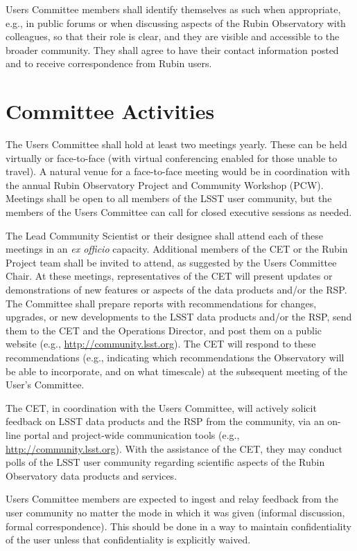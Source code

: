 \documentclass[OPS,toc]{lsstdoc}
\begin{document}
Users Committee members shall identify themselves as such when appropriate, e.g., in public forums or when discussing aspects of the Rubin Observatory with colleagues, so that their role is clear, and they are visible and accessible to the broader community.
They shall agree to have their contact information posted and to receive correspondence from Rubin users.

\section{Committee Activities}

The Users Committee shall hold at least two meetings yearly.
These can be held virtually or face-to-face (with virtual conferencing enabled for those unable to travel).
A natural venue for a face-to-face meeting would be in coordination with the annual Rubin Observatory Project and Community Workshop (PCW).
Meetings shall be open to all members of the LSST user community, but the members of the Users Committee can call for closed executive sessions as needed.  

The Lead Community Scientist or their designee shall attend each of these meetings in an \textit{ex officio} capacity.
Additional members of the CET or the Rubin Project team shall be invited to attend, as suggested by the Users Committee Chair.
At these meetings, representatives of the CET will present updates or demonstrations of new features or aspects of the data products and/or the RSP.
The Committee shall prepare reports with recommendations for changes, upgrades, or new developments to the LSST data products and/or the RSP, send them to the CET and the Operations Director, and post them on a public website (e.g., \url{http://community.lsst.org}).
The CET will respond to these recommendations (e.g., indicating which recommendations the Observatory will be able to incorporate, and on what timescale) at the subsequent meeting of the User’s Committee.  

The CET, in coordination with the Users Committee, will actively solicit feedback on LSST data products and the RSP from the community, via an on-line portal and project-wide communication tools (e.g., \url{http://community.lsst.org}).
With the assistance of the CET, they may conduct polls of the LSST user community regarding scientific aspects of the Rubin Observatory data products and services.  

Users Committee members are expected to ingest and relay feedback from the user community no matter the mode in which it was given (informal discussion, formal correspondence).
This should be done in a way to maintain confidentiality of the user unless that confidentiality is explicitly waived. 
\end{document}
